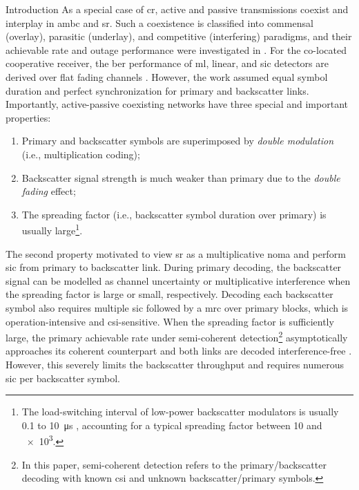 \documentclass[journal]{IEEEtran}
\begin{document}
\begin{section}{Introduction}
	As a special case of \gls{cr}, active and passive transmissions coexist and interplay in \gls{ambc} and \gls{sr}.
	Such a coexistence is classified into commensal (overlay), parasitic (underlay), and competitive (interfering) paradigms, and their achievable rate and outage performance were investigated in \cite{Guo2019b,Ding2020}.
	For the co-located cooperative receiver, the \gls{ber} performance of \gls{ml}, linear, and \gls{sic} detectors are derived over flat fading channels \cite{Yang2018}.
	However, the work assumed equal symbol duration and perfect synchronization for primary and backscatter links.
	Importantly, active-passive coexisting networks have three special and important properties:
	\begin{enumerate}
		\item Primary and backscatter symbols are superimposed by \emph{double modulation} (i.e., multiplication coding);
		\item Backscatter signal strength is much weaker than primary due to the \emph{double fading} effect;
		\item The spreading factor (i.e., backscatter symbol duration over primary) is usually large\footnote{The load-switching interval of low-power backscatter modulators is usually \num{0.1} to \SI{10}{\us} \cite{Torres2021}, accounting for a typical spreading factor between \num{10} and \num{e3}.}.
	\end{enumerate}
	The second property motivated \cite{Long2020a,Liang2020,Guo2019b,Ding2020,Zhou2019a,Wu2021a,Xu2021a,Yang2021a,Yang2018,Han2021,Zhang2022} to view \gls{sr} as a multiplicative \gls{noma} and perform \gls{sic} from primary to backscatter link.
	During primary decoding, the backscatter signal can be modelled as channel uncertainty or multiplicative interference when the spreading factor is large or small, respectively.
	Decoding each backscatter symbol also requires multiple \gls{sic} followed by a \gls{mrc} over primary blocks, which is operation-intensive and \gls{csi}-sensitive.
	When the spreading factor is sufficiently large, the primary achievable rate under semi-coherent detection\footnote{In this paper, semi-coherent detection refers to the primary/backscatter decoding with known \gls{csi} and unknown backscatter/primary symbols.} asymptotically approaches its coherent counterpart and both links are decoded interference-free \cite{Long2020a}.
	However, this severely limits the backscatter throughput and requires numerous \gls{sic} per backscatter symbol.


\end{section}
\end{document}
